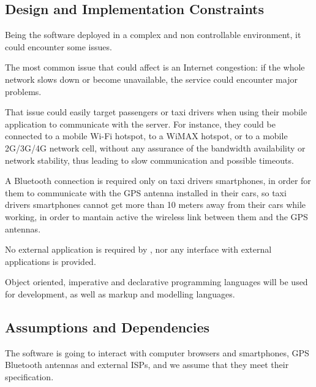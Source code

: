 \subsection{Design and Implementation Constraints}
Being the software deployed in a complex and non controllable environment, it could encounter some issues.\par
The most common issue that could affect \myTaxiService{} is an Internet congestion: if the whole network slows down or become unavailable, the service could encounter major problems.\par
That issue could easily target passengers or taxi drivers when using their mobile application to communicate with the server.
For instance, they could be connected to a mobile Wi-Fi hotspot, to a WiMAX hotspot, or to a mobile 2G/3G/4G network cell, without any assurance of the bandwidth availability or network stability, thus leading to slow communication and possible timeouts.\par
A Bluetooth connection is required only on taxi drivers smartphones, in order for them to communicate with the GPS antenna installed in their cars, so taxi drivers smartphones cannot get more than 10 meters away from their cars while working, in order to mantain active the wireless link between them and the GPS antennas.\par
No external application is required by \myTaxiService{}, nor any interface with external applications is provided.\par
Object oriented, imperative and declarative programming languages will be used for \myTaxiService{} development, as well as markup and modelling languages.\par
\subsection{Assumptions and Dependencies}
The software is going to interact with computer browsers and smartphones, GPS Bluetooth antennas and external ISPs, and we assume that they meet their specification.